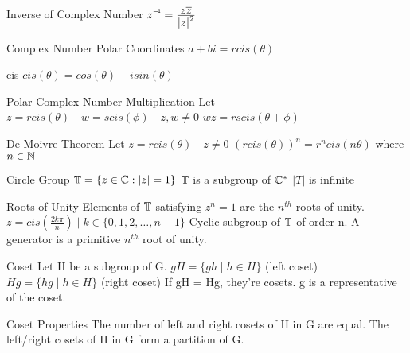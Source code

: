 \begin{flashcard}[Definition]{Inverse of Complex Number}
  $\inv{z} = \ddfrac{z\overline{z}}{|z|^2}$
\end{flashcard}

\begin{flashcard}[Definition]{Complex Number Polar Coordinates}
  $a + bi = r cis(\theta)$
\end{flashcard}

\begin{flashcard}[Definition]{cis}
  $cis(\theta) = cos(\theta) + isin(\theta)$
\end{flashcard}

\begin{flashcard}[Definition]{Polar Complex Number Multiplication}
  Let $z = rcis(\theta) \quad w = scis(\phi) \quad z,w \neq 0$
  \vfill
  $wz = rscis(\theta + \phi)$
\end{flashcard}

\begin{flashcard}[Definition]{De Moivre Theorem}
  Let $z = rcis(\theta) \quad z \neq 0$
  \vfill
  $(rcis(\theta))^n = r^ncis(n\theta)$ where $n \in \mathbb{N}$
\end{flashcard}

\begin{flashcard}[Definition]{Circle Group}
  $\mathbb{T} = \{ z \in \mathbb{C} : |z| = 1 \}$
  \vfill
  $\mathbb{T}$ is a subgroup of $\mathbb{C}^*$
  \vfill
  $|T|$ is infinite
\end{flashcard}

\begin{flashcard}[Definition]{Roots of Unity}
  Elements of $\mathbb{T}$ satisfying $z^n = 1$ are the $n^{th}$ roots of unity.
  \vfill
  $z = cis(\frac{2k\pi}{n}) \mid k \in \{ 0, 1, 2, \dots, n-1 \}$
  \vfill
  Cyclic subgroup of $\mathbb{T}$ of order n. A generator is a primitive $n^{th}$ root of unity.
\end{flashcard}

\begin{flashcard}[Definition]{Coset}
  Let H be a subgroup of G.
  \vfill
  $gH = \{ gh \mid h \in H \}$ (left coset) \smallskip
  $Hg = \{ hg \mid h \in H \}$ (right coset)
  \vfill
  If gH = Hg, they're cosets.
  \vfill
  g is a representative of the coset.
\end{flashcard}

\begin{flashcard}[Definition]{Coset Properties}
  The number of left and right cosets of H in G are equal.
  \vfill
  The left/right cosets of H in G form a partition of G.
\end{flashcard}


